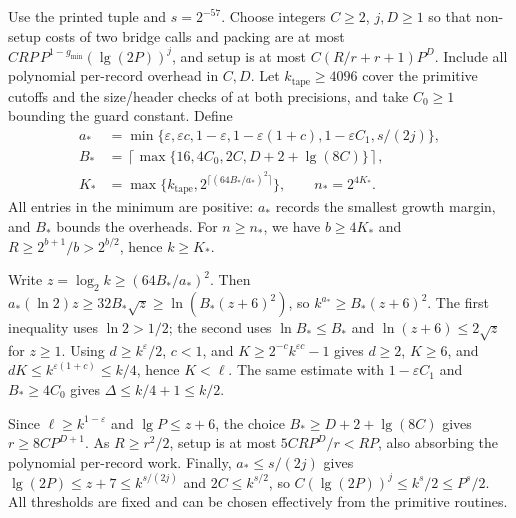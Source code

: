 \documentclass[11pt]{article}
\theoremstyle{definition}
\newcommand{\eps}{\varepsilon}
\begin{document}
Use the printed tuple and $s=2^{-57}$.
Choose integers $C\ge2$, $j,D\ge1$ so that non-setup costs of two bridge calls
and packing are at most $CRP\,P^{1-g_{\min}}(\lg(2P))^j$,
and setup is at most $C(R/r+r+1)P^D$.
Include all polynomial per-record overhead in $C,D$.
Let $k_{\mathrm{tape}}\ge4096$ cover the primitive cutoffs and the size/header
checks of  at both precisions, and take $C_0\ge1$
bounding the guard constant. Define
\[
\begin{aligned}
 a_*&=\min\{\eps,\eps c,1-\eps,1-\eps(1+c),1-\eps C_1,s/(2j)\},\\
 B_*&=\left\lceil\max\{16,4C_0,2C,D+2+\lg(8C)\}\right\rceil,\\
 K_*&=\max\{k_{\mathrm{tape}},2^{\lceil(64B_*/a_*)^2\rceil}\},
 \qquad n_*=2^{4K_*}.
\end{aligned}
\]
All entries in the minimum are positive: $a_*$ records the smallest growth margin, and $B_*$ bounds the overheads.
For $n\ge n_*$, we have $b\ge4K_*$ and
$R\ge2^{b+1}/b>2^{b/2}$, hence $k\ge K_*$.

Write $z=\log_2k\ge(64B_*/a_*)^2$.
Then $a_*(\ln2)z\ge32B_*\sqrt z\ge\ln(B_*(z+6)^2)$,
so $k^{a_*}\ge B_*(z+6)^2$.
The first inequality uses $\ln2>1/2$; the second uses $\ln B_*\le B_*$
and $\ln(z+6)\le2\sqrt z$ for $z\ge1$.
Using $d\ge k^\eps/2$, $c<1$, and $K\ge2^{-c}k^{\eps c}-1$ gives
$d\ge2$, $K\ge6$, and $dK\le k^{\eps(1+c)}\le k/4$, hence $K<\ell$.
The same estimate with $1-\eps C_1$ and $B_*\ge4C_0$ gives
$\Delta\le k/4+1\le k/2$.

Since $\ell\ge k^{1-\eps}$ and $\lg P\le z+6$, the choice
$B_*\ge D+2+\lg(8C)$ gives $r\ge8CP^{D+1}$.
As $R\ge r^2/2$, setup is at most $5CRP^D/r<RP$, also absorbing the polynomial per-record work.
Finally, $a_*\le s/(2j)$ gives
$\lg(2P)\le z+7\le k^{s/(2j)}$ and $2C\le k^{s/2}$, so
$C(\lg(2P))^j\le k^s/2\le P^s/2$.
All thresholds are fixed and can be chosen effectively from the primitive routines.
\end{document}
